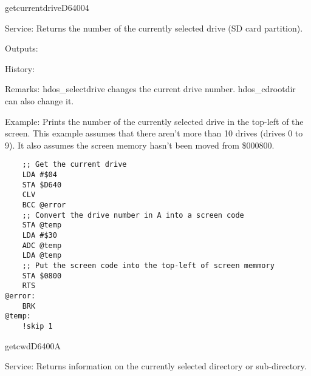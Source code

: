 \newpage
\begin{hyppotrap}{getcurrentdrive}{D640}{04}
\item [Service:]
  Returns the number of the currently selected drive (SD card partition).
\item [Outputs:]
\item [History:]
\item [Remarks:]
  hdos\_selectdrive changes the current drive number. hdos\_cdrootdir
  can also change it.
\item [Example:]
  Prints the number of the currently selected drive in the top-left of the
  screen. This example assumes that there aren't more than 10 drives (drives
  0 to 9). It also assumes the screen memory hasn't been moved from \$000800.
\begin{tcolorbox}[colback=black,coltext=white]
\verbatimfont{\codefont}
\begin{verbatim}
    ;; Get the current drive
    LDA #$04
    STA $D640
    CLV
    BCC @error
    ;; Convert the drive number in A into a screen code
    STA @temp
    LDA #$30
    ADC @temp
    LDA @temp
    ;; Put the screen code into the top-left of screen memmory
    STA $0800
    RTS
@error:
    BRK
@temp:
    !skip 1
\end{verbatim}
\end{tcolorbox}
\end{hyppotrap}


\newpage
\begin{hyppotrap}{getcwd}{D640}{0A}
\item [Service:]
  Returns information on the currently selected directory or sub-directory.
\notimplemented
\end{hyppotrap}


